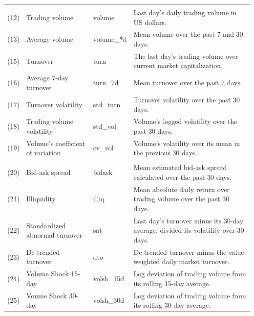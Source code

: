\documentclass[
  12pt,
  a4paper,
  openany]{scrbook}
\begin{document}
\begin{table}
\begin{tabular}[t]{l>{\raggedright\arraybackslash}p{10em}l>{\raggedright\arraybackslash}p{27em}}
\addlinespace[0.3em]
\multicolumn{4}{l}{\textbf{Panel C: Trading activity}}\\
\hspace{1em}(12) & Trading volume & volume & Last day's daily trading volume in US dollars.\\
\hspace{1em}(13) & Average volume & volume\_*d & Mean volume over the past 7 and 30 days.\\
\hspace{1em}(15) & Turnover & turn & The last day's trading volume over current market capitalization.\\
\hspace{1em}(16) & Average 7-day turnover & turn\_7d & Mean turnover over the past 7 days.\\
\hspace{1em}(17) & Turnover volatility & std\_turn & Turnover volatility over the past 30 days.\\
\hspace{1em}(18) & Trading volume volatility & std\_vol & Volume's logged volatility over the past 30 days.\\
\hspace{1em}(19) & Volume's coefficient of variation & cv\_vol & Volume's volatility over its mean in the previous 30 days.\\
\addlinespace[0.3em]
\multicolumn{4}{l}{\textbf{Panel D: Liquidity}}\\
\hspace{1em}(20) & Bid-ask spread & bidask & Mean estimated bid-ask spread calculated over the past 30 days.\\
\hspace{1em}(21) & Illiquidity & illiq & Mean absolute daily return over trading volume over the past 30 days.\\
\hspace{1em}(22) & Standardized abnormal turnover & sat & Last day's turnover minus its 30-day average, divided its volatility over 30 days.\\
\hspace{1em}(23) & De-trended turnover & dto & De-trended turnover minus the value-weighted daily market turnover.\\
\hspace{1em}(24) & Volume Shock 15-day & volsh\_15d & Log deviation of trading volume from its rolling 15-day average.\\
\hspace{1em}(25) & Voume Shock 30-day & volsh\_30d & Log deviation of trading volume from its rolling 30-day average.\\

\end{tabular}
\end{table}
\end{document}
